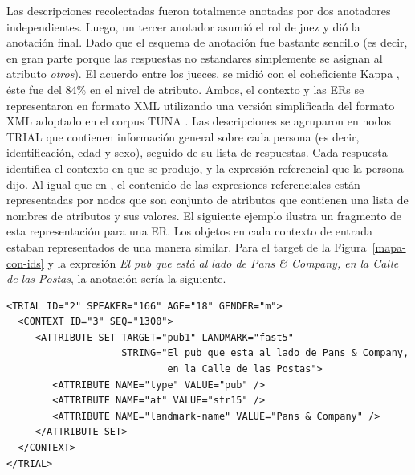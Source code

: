
Las descripciones recolectadas fueron totalmente anotadas por dos anotadores independientes. Luego, un tercer anotador asumi\'o el rol de juez y di\'o la anotaci\'on final. Dado que el esquema de anotaci\'on fue bastante sencillo (es decir, en gran parte porque las respuestas no estandares simplemente se asignan al atributo {\em otros}). El acuerdo entre los jueces, se midi\'o con el coheficiente Kappa \cite{kappa}, \'este fue del 84\% en el nivel de atributo.
Ambos, el contexto y las ERs se representaron en formato XML utilizando una versi\'on simplificada del formato XML adoptado en el corpus TUNA \cite{tuna-corpus}. Las descripciones se agruparon en nodos TRIAL que contienen informaci\'on general sobre cada persona (es decir, identificaci\'on, edad y sexo), seguido de su lista de respuestas. Cada respuesta identifica el contexto en que se produjo, y la expresi\'on referencial que la persona dijo.
Al igual que en \cite{tuna-corpus}, el contenido de las expresiones referenciales est\'an representadas por nodos que son conjunto de atributos que contienen una lista de nombres de atributos y sus valores. El siguiente ejemplo ilustra un fragmento de esta representaci\'on para una ER. Los objetos en cada contexto de entrada estaban representados de una manera similar.
Para el target de la Figura~\ref{mapa-con-ids} y la expresi\'on {\it El pub que est\'a al lado de Pans \& Company, en la
Calle de las Postas}, la anotaci\'on ser\'ia la siguiente.
\begin{verbatim}
<TRIAL ID="2" SPEAKER="166" AGE="18" GENDER="m">
  <CONTEXT ID="3" SEQ="1300">
     <ATTRIBUTE-SET TARGET="pub1" LANDMARK="fast5" 
                    STRING="El pub que esta al lado de Pans & Company, 
                            en la Calle de las Postas">
        <ATTRIBUTE NAME="type" VALUE="pub" />
        <ATTRIBUTE NAME="at" VALUE="str15" />
        <ATTRIBUTE NAME="landmark-name" VALUE="Pans & Company" />
     </ATTRIBUTE-SET>
  </CONTEXT>
</TRIAL>	
\end{verbatim}



